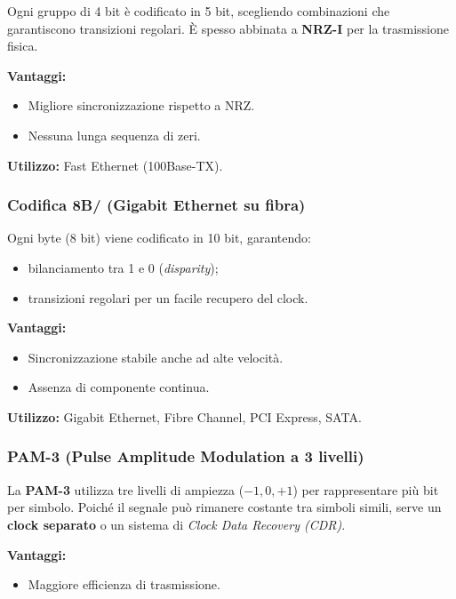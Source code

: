\documentclass[a4paper,12pt]{report}
\begin{document}
Ogni gruppo di 4 bit è codificato in 5 bit, scegliendo combinazioni che garantiscono transizioni regolari.  
È spesso abbinata a \textbf{NRZ-I} per la trasmissione fisica.

\textbf{Vantaggi:}
\begin{itemize}
    \item Migliore sincronizzazione rispetto a NRZ.
    \item Nessuna lunga sequenza di zeri.
\end{itemize}

\textbf{Utilizzo:} Fast Ethernet (100Base-TX).

\subsubsection{Codifica 8B/ (Gigabit Ethernet su fibra)}

Ogni byte (8 bit) viene codificato in 10 bit, garantendo:
\begin{itemize}
    \item bilanciamento tra 1 e 0 (\textit{disparity});
    \item transizioni regolari per un facile recupero del clock.
\end{itemize}

\textbf{Vantaggi:}
\begin{itemize}
    \item Sincronizzazione stabile anche ad alte velocità.
    \item Assenza di componente continua.
\end{itemize}

\textbf{Utilizzo:} Gigabit Ethernet, Fibre Channel, PCI Express, SATA.

\subsubsection{PAM-3 (Pulse Amplitude Modulation a 3 livelli)}

La \textbf{PAM-3} utilizza tre livelli di ampiezza (\(-1, 0, +1\)) per rappresentare più bit per simbolo.  
Poiché il segnale può rimanere costante tra simboli simili, serve un \textbf{clock separato} o un sistema di \textit{Clock Data Recovery (CDR)}.

\textbf{Vantaggi:}
\begin{itemize}
    \item Maggiore efficienza di trasmissione.
\end{itemize}
\end{document}

